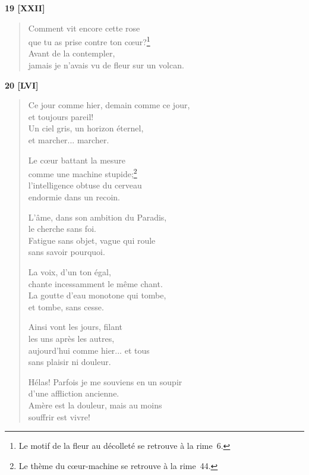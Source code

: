 \pagebreak

\begin{center}
  \textbf{19 [XXII]}
\end{center}

\begin{verse}
  Comment vit encore cette rose \\
  que tu as prise contre ton cœur?\footnote{Le motif de la fleur au
  décolleté se retrouve à la rime~6.} \\
  Avant de la contempler, \\
  jamais je n'avais vu de fleur sur un volcan.
\end{verse}


\begin{center}
  \textbf{20 [LVI]}
\end{center}

\begin{verse}
  Ce jour comme hier, demain comme ce jour, \\
  et toujours pareil! \\
  Un ciel gris, un horizon éternel, \\
  et marcher... marcher.

  Le cœur battant la mesure \\
  comme une machine stupide;\footnote{Le thème du cœur-machine se
  retrouve à la rime~44.} \\
  l'intelligence obtuse du cerveau \\
  endormie dans un recoin.

  L'âme, dans son ambition du Paradis, \\
  le cherche sans foi. \\
  Fatigue sans objet, vague qui roule \\
  sans savoir pourquoi.

  La voix, d'un ton égal, \\
  chante incessamment le même chant. \\
  La goutte d'eau monotone qui tombe, \\
  et tombe, sans cesse.

  Ainsi vont les jours, filant \\
  les uns après les autres, \\
  aujourd'hui comme hier... et tous \\
  sans plaisir ni douleur.

  Hélas! Parfois je me souviens en un soupir \\
  d'une affliction ancienne. \\
  Amère est la douleur, mais au moins \\
  souffrir est vivre!
\end{verse}

